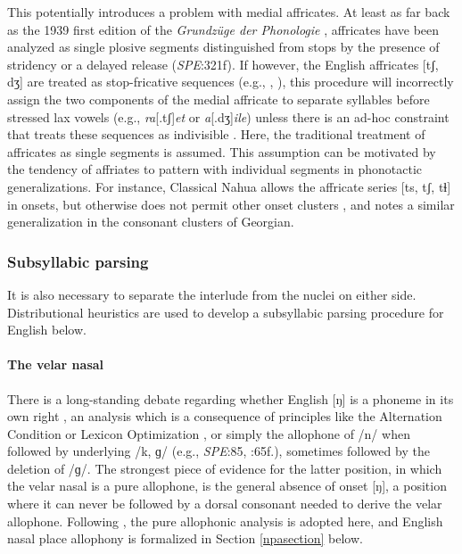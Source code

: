 This potentially introduces a problem with medial affricates. At least as far back as the 1939 first edition of the \emph{Grundzüge der Phonologie} \citep{Trubetzkoy1958}, affricates have been analyzed as single plosive segments distinguished from stops by the presence of stridency \citep[24]{Jakobson1961} or a delayed release (\emph{SPE}:321f). If however, the English affricates [tʃ, dʒ] are treated as stop-fricative sequences (e.g., \citealt{Hualde1988}, \citealt{Lombardi1990}), this procedure will incorrectly assign the two components of the medial affricate to separate syllables before stressed lax vowels (e.g., \emph{ra}[.tʃ]\emph{et} or \emph{a}[.dʒ]\emph{ile}) unless there is an ad-hoc constraint that treats these sequences as indivisible \citep[e.g.,][]{Wells1990}. Here, the traditional treatment of affricates as single segments is assumed. This assumption can be motivated by the tendency of affriates to pattern with individual segments in phonotactic generalizations. For instance, Classical Nahua allows the affricate series [ts, tʃ, tɬ] in onsets, but otherwise does not permit other onset clusters \citep[9]{Launey2011}, and \citet[86]{Butskhrikidze2002} notes a similar generalization in the consonant clusters of Georgian.

\subsubsection{Subsyllabic parsing}

It is also necessary to separate the interlude from the nuclei on either side. Distributional heuristics are used to develop a subsyllabic parsing procedure for English below.

\paragraph{The velar nasal} There is a long-standing debate regarding whether English [ŋ] is a phoneme in its own right \citep[e.g.,][]{Sapir1925}, an analysis which is a consequence of principles like the Alternation Condition \citep{Kiparsky1968} or Lexicon Optimization \citep[53]{OT}, or simply the allophone of /n/ when followed by underlying /k, ɡ/ (e.g., \emph{SPE}:85, \citealt{Borowsky1986}:65f.), sometimes followed by the deletion of /ɡ/. The strongest piece of evidence for the latter position, in which the velar nasal is a pure allophone, is the general absence of onset [ŋ], a position where it can never be followed by a dorsal consonant needed to derive the velar allophone. Following \citet{Pierrehumbert1994}, the pure allophonic analysis is adopted here, and English nasal place allophony is formalized in Section \ref{npasection} below.

